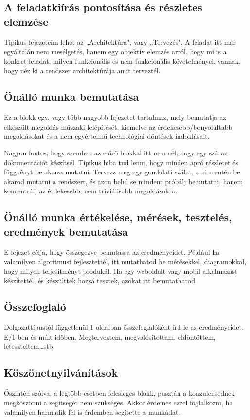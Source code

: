 \documentclass{sapientia-thesis}
\begin{document}
\subsection{A feladatkiírás pontosítása és részletes elemzése}
Tipikus fejezetcím lehet az „Architektúra", vagy „Tervezés". A feladat itt már egyáltalán nem mesélgetés, hanem egy objektív elemzés arról, hogy mi is a konkret feladat, milyen funkcionális és nem funkcionális követelmények vannak, hogy néz ki a rendszer architektúrája amit terveztél.

\subsection{Önálló munka bemutatása}
Ez a blokk egy, vagy több nagyobb fejezetet tartalmaz, mely bemutatja az elkészült megoldás műszaki felépítését, kiemelve az érdekesebb/bonyolultabb megoldásokat és a nem egyértelmű technológiai döntések indoklásait.

Nagyon fontos, hogy szemben az előző blokkal itt nem cél, hogy egy száraz dokumentációt készítsél. Tipikus hiba tud lenni, hogy minden apró részletet és függvényt be akarsz mutatni. Tervezz meg egy gondolati szálat, ami mentén be akarod mutatni a rendszert, és azon belül se mindent próbálj bemutatni, hanem koncentrálj az érdekesebb, nem triviálisabb megoldásokra.

\subsection{Önálló munka értékelése, mérések, tesztelés, eredmények bemutatása}
E fejezet célja, hogy összegezve bemutassa az eredményeidet. Például ha valamilyen algoritmust fejlesztettél, itt mutathatod be mérésekkel, diagramokkal, hogy milyen teljesítményt produkál. Ha egy weboldalt vagy mobil alkalmazást készítettél, és készülttek hozzá tesztek, azokat itt bemutathatod.

\subsection{Összefoglaló}
Dolgozattípustól függetlenül 1 oldalban összefoglalóként írd le az eredményeidet. E/1-ben és múlt időben. Megterveztem, megvalósítottam, eldöntöttem, leteszteltem\ldots stb.

\subsection{Köszönetnyilvánítások}
Őszintén szólva, a legtöbb esetben felesleges blokk, pusztán a konzulensednek megköszönni a segítségét nem szükséges. Akkor érdemes ezzel foglalkozni, ha valamilyen harmadik fél is érdemben segítette a munkádat.
\end{document}

